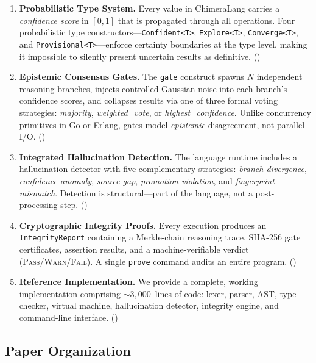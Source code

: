 \documentclass[11pt,a4paper]{article}
\begin{document}
\begin{enumerate}[leftmargin=2em]
  \item \textbf{Probabilistic Type System.}
    Every value in ChimeraLang carries a \emph{confidence score} in $[0, 1]$
    that is propagated through all operations. Four probabilistic type
    constructors---\texttt{Confident<T>}, \texttt{Explore<T>},
    \texttt{Converge<T>}, and \texttt{Provisional<T>}---enforce certainty
    boundaries at the type level, making it impossible to silently present
    uncertain results as definitive. ()

  \item \textbf{Epistemic Consensus Gates.}
    The \texttt{gate} construct spawns $N$ independent reasoning branches, injects
    controlled Gaussian noise into each branch's confidence scores, and collapses
    results via one of three formal voting strategies: \emph{majority},
    \emph{weighted\_vote}, or \emph{highest\_confidence}. Unlike concurrency
    primitives in Go or Erlang, gates model \emph{epistemic} disagreement, not
    parallel I/O. ()

  \item \textbf{Integrated Hallucination Detection.}
    The language runtime includes a hallucination detector with five complementary
    strategies: \emph{branch divergence}, \emph{confidence anomaly},
    \emph{source gap}, \emph{promotion violation}, and \emph{fingerprint
    mismatch}. Detection is structural---part of the language, not a
    post-processing step. ()

  \item \textbf{Cryptographic Integrity Proofs.}
    Every execution produces an \texttt{IntegrityReport} containing a Merkle-chain
    reasoning trace, SHA-256 gate certificates, assertion results, and a
    machine-verifiable verdict (\textsc{Pass}/\textsc{Warn}/\textsc{Fail}).
    A single \texttt{prove} command audits an entire program. ()

  \item \textbf{Reference Implementation.}
    We provide a complete, working implementation comprising ${\sim}3{,}000$~lines
    of code: lexer, parser, AST, type checker, virtual machine, hallucination
    detector, integrity engine, and command-line interface. ()
\end{enumerate}

\subsection{Paper Organization}
\end{document}
